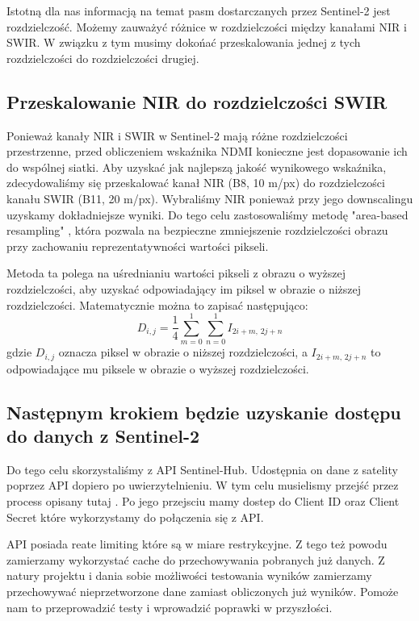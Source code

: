 \documentclass[12pt,a4paper]{article}
\begin{document}
Istotną dla nas informacją na temat pasm dostarczanych przez Sentinel-2 jest rozdzielczość. Możemy zauważyć różnice w rozdzielczości między kanałami NIR i SWIR. W związku z tym musimy dokońać przeskalowania jednej z tych rozdzielczości do rozdzielczości drugiej.

\subsection{Przeskalowanie NIR do rozdzielczości SWIR}
Ponieważ kanały NIR i SWIR w Sentinel-2 mają różne rozdzielczości przestrzenne, przed obliczeniem wskaźnika NDMI konieczne jest dopasowanie ich do wspólnej siatki. Aby uzyskać jak najlepszą jakość wynikowego wskaźnika, zdecydowaliśmy się przeskalować kanał NIR (B8, 10 m/px) do rozdzielczości kanału SWIR (B11, 20 m/px). 
Wybraliśmy NIR ponieważ przy jego downscalingu uzyskamy dokładniejsze wyniki.
Do tego celu zastosowaliśmy metodę "area-based resampling" \cite{area_based_resampling}, która pozwala na bezpieczne zmniejszenie rozdzielczości obrazu przy zachowaniu reprezentatywności wartości pikseli.

Metoda ta polega na uśrednianiu wartości pikseli z obrazu o wyższej rozdzielczości, aby uzyskać odpowiadający im piksel w obrazie o niższej rozdzielczości. Matematycznie można to zapisać następująco:
\[
D_{i,j} = \frac{1}{4} \sum_{m=0}^{1} \sum_{n=0}^{1} I_{2i+m,\,2j+n}
\]
gdzie $D_{i,j}$ oznacza piksel w obrazie o niższej rozdzielczości, a $I_{2i+m,\,2j+n}$ to odpowiadające mu piksele w obrazie o wyższej rozdzielczości.

\subsection{Następnym krokiem będzie uzyskanie dostępu do danych z Sentinel-2}

Do tego celu skorzystaliśmy z API Sentinel-Hub. \cite{sentinel2_api_docs} 
Udostępnia on dane z satelity poprzez API dopiero po uwierzytelnieniu. 
W tym celu musielismy przejść przez process opisany tutaj \cite{sentinel2_api_docs_auth}.
Po jego przejsciu mamy dostep do Client ID oraz Client Secret które wykorzystamy do połączenia się z API.

API posiada reate limiting które są w miare restrykcyjne. \cite{sentinel2_api_auth_rate_limiting}
Z tego też powodu zamierzamy wykorzystać cache do przechowywania pobranych już danych.
Z natury projektu i dania sobie możliwości testowania wyników zamierzamy przechowywać nieprzetworzone dane zamiast obliczonych już wyników.
Pomoże nam to przeprowadzić testy i wprowadzić poprawki w przyszłości.
\end{document}
